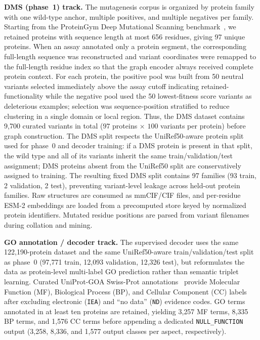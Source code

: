 \documentclass[11pt,a4paper]{article}
\begin{document}
\textbf{DMS (phase~1) track.} The mutagenesis corpus is organized by protein family with one wild-type anchor, multiple positives, and multiple negatives per family. Starting from the ProteinGym Deep Mutational Scanning benchmark~\cite{notin2023proteingym}, we retained proteins with sequence length at most 656 residues, giving 97 unique proteins. When an assay annotated only a protein segment, the corresponding full-length sequence was reconstructed and variant coordinates were remapped to the full-length residue index so that the graph encoder always received complete protein context. For each protein, the positive pool was built from 50 neutral variants selected immediately above the assay cutoff indicating retained-functionality while the negative pool used the 50 lowest-fitness score variants as deleterious examples; selection was sequence-position stratified to reduce clustering in a single domain or local region. Thus, the DMS dataset contains 9,700 curated variants in total ($97$ proteins $\times$ $100$ variants per protein) before graph construction. The DMS split respects the UniRef50-aware protein split used for phase~0 and decoder training: if a DMS protein is present in that split, the wild type and all of its variants inherit the same train/validation/test assignment; DMS proteins absent from the UniRef50 split are conservatively assigned to training. The resulting fixed DMS split contains 97 families (93 train, 2 validation, 2 test), preventing variant-level leakage across held-out protein families. Raw structures are consumed as mmCIF/CIF files, and per-residue ESM-2 embeddings are loaded from a precomputed store keyed by normalized protein identifiers. Mutated residue positions are parsed from variant filenames during collation and mining.

\textbf{GO annotation / decoder track.} The supervised decoder uses the same 122,190-protein dataset and the same UniRef50-aware train/validation/test split as phase~0 (97,771 train, 12,093 validation, 12,326 test), but reformulates the data as protein-level multi-label GO prediction rather than semantic triplet learning. Curated UniProt-GOA Swiss-Prot annotations~\cite{uniprot2023,geneontology2021} provide Molecular Function (MF), Biological Process (BP), and Cellular Component (CC) labels after excluding electronic (\texttt{IEA}) and ``no data'' (\texttt{ND}) evidence codes. GO terms annotated in at least ten proteins are retained, yielding 3{,}257 MF terms, 8{,}335 BP terms, and 1{,}576 CC terms before appending a dedicated \texttt{NULL\_FUNCTION} output (3{,}258, 8{,}336, and 1{,}577 output classes per aspect, respectively).
\end{document}
